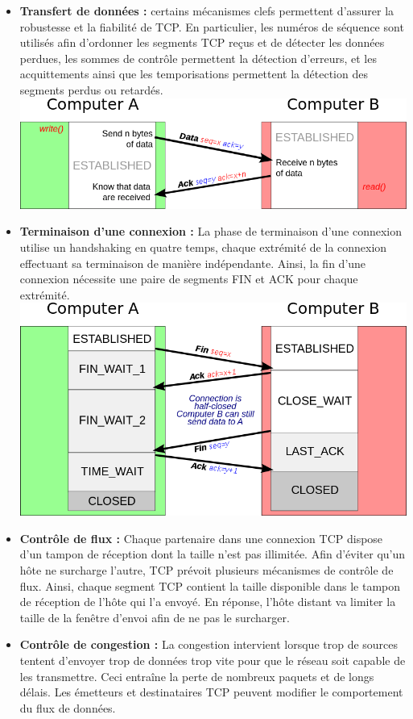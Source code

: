 \documentclass[a4paper,9pt, twocolumn]{article}
\begin{document}
\begin{itemize}
\item \textbf{Transfert de données : }certains mécanismes clefs permettent d'assurer la robustesse et la fiabilité de TCP. En particulier, les numéros de séquence sont utilisés afin d'ordonner les segments TCP reçus et de détecter les données perdues, les sommes de contrôle permettent la détection d'erreurs, et les acquittements ainsi que les temporisations permettent la détection des segments perdus ou retardés.
\includegraphics[scale=0.28]{trans.png}
\item \textbf{Terminaison d'une connexion : }La phase de terminaison d'une connexion utilise un handshaking en quatre temps, chaque extrémité de la connexion effectuant sa terminaison de manière indépendante. Ainsi, la fin d'une connexion nécessite une paire de segments FIN et ACK pour chaque extrémité.
\includegraphics[scale=0.28]{term.png}
\item \textbf{Contrôle de flux :} Chaque partenaire dans une connexion TCP dispose d'un tampon de réception dont la taille n'est pas illimitée. Afin d'éviter qu'un hôte ne surcharge l'autre, TCP prévoit plusieurs mécanismes de contrôle de flux. Ainsi, chaque segment TCP contient la taille disponible dans le tampon de réception de l'hôte qui l'a envoyé. En réponse, l'hôte distant va limiter la taille de la fenêtre d'envoi afin de ne pas le surcharger.
\item \textbf{Contrôle de congestion :} La congestion intervient lorsque trop de sources tentent d'envoyer trop de données trop vite pour que le réseau soit capable de les transmettre. Ceci entraîne la perte de nombreux paquets et de longs délais. Les émetteurs et destinataires TCP peuvent modifier le comportement du flux de données.  
\end{itemize}
\end{document}
